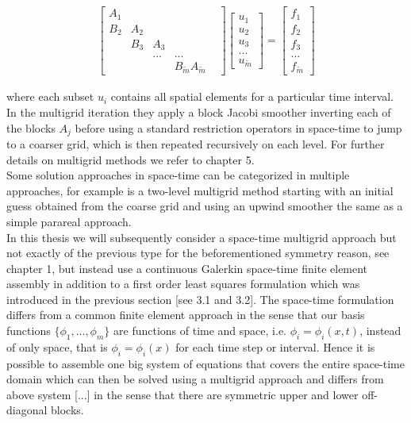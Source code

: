 \documentclass[../draft_1.tex]{subfiles}
\begin{document}
\begin{ceqn}
	\begin{equation}
	\begin{aligned}
	\begin{bmatrix}
	A_1 & & & & \\
	B_2 & A_2 & & & \\
	& B_3 & A_3 & & \\
	& & ... & ... & \\
	& & & B_{\tilde{m}} A_{\tilde{m}} 
	\end{bmatrix}
	\begin{bmatrix}
	u_1 \\
	u_2 \\
	u_3 \\
	... \\
	u_{\tilde{m}} 
	\end{bmatrix}
	= \begin{bmatrix}
	f_1 \\
	f_2 \\
	f_3 \\
	... \\
	f_{\tilde{m}} 
	\end{bmatrix}
	\end{aligned}
	\end{equation}
\end{ceqn}
where each subset $u_i$ contains all spatial elements for a particular time interval. In the multigrid iteration they apply a block Jacobi smoother inverting each of the blocks $A_j$ before using a standard restriction operators in space-time to jump to a coarser grid, which is then repeated recursively on each level. For further details on multigrid methods we refer to chapter 5. 
\smallskip
\\
Some solution approaches in space-time can be categorized in multiple approaches, for example is a two-level multigrid method starting with an initial guess obtained from the coarse grid and using an upwind smoother the same as a simple parareal approach.
\smallskip
\\
In this thesis we will subsequently consider a space-time multigrid approach but not exactly of the previous type for the beforementioned symmetry reason, see chapter 1, but instead use a continuous Galerkin space-time finite element assembly in addition to a first order least squares formulation which was introduced in the previous section [see 3.1 and 3.2]. The space-time formulation differs from a common finite element approach in the sense that our basis functions $\{\phi_1, ..., \phi_m\}$ are functions of time and space, i.e. $\phi_i = \phi_i(x,t)$, instead of only space, that is $\phi_i = \phi_i(x)$ for each time step or interval. Hence it is possible to assemble one big system of equations that covers the entire space-time domain which can then be solved using a multigrid approach and differs from above system [...] in the sense that there are symmetric upper and lower off-diagonal blocks. 
\end{document}
